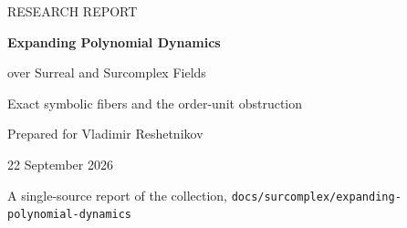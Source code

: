 \documentclass[11pt,a4paper]{article}
\numberwithin{equation}{section}
\theoremstyle{plain}
\theoremstyle{definition}
\theoremstyle{remark}
\newcommand{\R}{\mathbb R}
\newcommand{\C}{\mathbb C}
\newcommand{\N}{\mathbb N}
\newcommand{\OO}{\mathcal O}
\newcommand{\red}{\operatorname{red}}
\begin{document}
\hypersetup{pageanchor=false}
\begin{titlepage}
\vspace*{4mm}
{\color{ink}\large RESEARCH REPORT\par}
\vspace{4mm}
{\color{ink}\huge\bfseries Expanding Polynomial Dynamics\par
 over Surreal and Surcomplex Fields\par}
\vspace{6mm}
{\Large Exact symbolic fibers and the order-unit obstruction\par}
\vspace{6mm}
{\large Prepared for Vladimir Reshetnikov\par}
\vspace{2mm}
{\color{muted}22 September 2026\par}
\vspace{2mm}
{\small\color{muted}A single-source report of the collection,
\texttt{docs/surcomplex/expanding-polynomial-dynamics}\par}
\vspace{8mm}
\begin{abstract}
Let $K=k((t^\Gamma))$, with $k=\R$ or $\C$ and $\Gamma$ an arbitrary
nonzero set-sized ordered abelian group. We study
$F=q^{-1}P$, where $v(q)=\kappa>0$,
$\deg P=\deg\red P=d\ge2$, and the reduction of
$P\in\OO[X]$ splits into distinct roots in $k$. We construct, by finite-parameter
formal algebra and strong Hahn evaluation, a canonical point $x_s$ for
every one-sided $d$-symbol itinerary. The entire integral nonescaping set
is the disjoint union $\bigsqcup_s(x_s+I_\kappa)$, where
$I_\kappa=\{h:v(h)>n\kappa\text{ for every }n\in\N\}$.
Different itineraries first separating at time $m$ have distance valuation
exactly $m\kappa$.


\end{abstract}
\end{titlepage}
\end{document}

